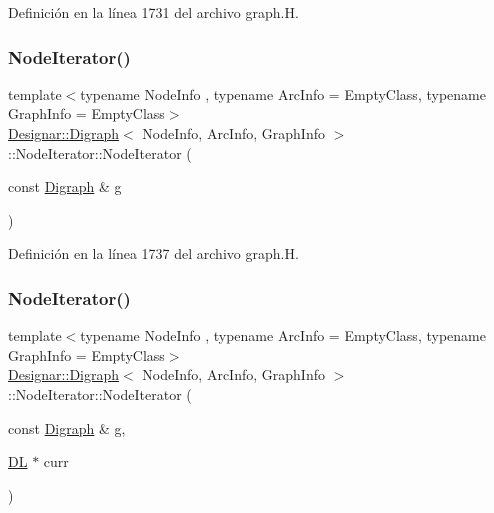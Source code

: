 Definición en la línea 1731 del archivo graph.\+H.

\mbox{\label{class_designar_1_1_digraph_1_1_node_iterator_aa54e560d151fad3a8e36c91dc4006ce4}} 
\subsubsection{\texorpdfstring{Node\+Iterator()}{NodeIterator()}\hspace{0.1cm}{\footnotesize\ttfamily [2/5]}}
{\footnotesize\ttfamily template$<$typename Node\+Info , typename Arc\+Info  = Empty\+Class, typename Graph\+Info  = Empty\+Class$>$ \\
\hyperlink{class_designar_1_1_digraph}{Designar\+::\+Digraph}$<$ Node\+Info, Arc\+Info, Graph\+Info $>$\+::Node\+Iterator\+::\+Node\+Iterator (\begin{DoxyParamCaption}\item[{const \hyperlink{class_designar_1_1_digraph}{Digraph} \&}]{g }\end{DoxyParamCaption})\hspace{0.3cm}{\ttfamily [inline]}}



Definición en la línea 1737 del archivo graph.\+H.

\mbox{\label{class_designar_1_1_digraph_1_1_node_iterator_a2a8d16402a7ec8ac1675cb2729bc4726}} 
\subsubsection{\texorpdfstring{Node\+Iterator()}{NodeIterator()}\hspace{0.1cm}{\footnotesize\ttfamily [3/5]}}
{\footnotesize\ttfamily template$<$typename Node\+Info , typename Arc\+Info  = Empty\+Class, typename Graph\+Info  = Empty\+Class$>$ \\
\hyperlink{class_designar_1_1_digraph}{Designar\+::\+Digraph}$<$ Node\+Info, Arc\+Info, Graph\+Info $>$\+::Node\+Iterator\+::\+Node\+Iterator (\begin{DoxyParamCaption}\item[{const \hyperlink{class_designar_1_1_digraph}{Digraph} \&}]{g,  }\item[{\hyperlink{class_designar_1_1_d_l}{DL} $\ast$}]{curr }\end{DoxyParamCaption})\hspace{0.3cm}{\ttfamily [inline]}}



